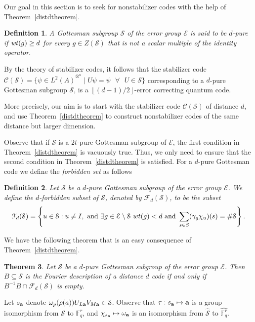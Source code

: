 \documentclass{Rinton-P9x6}
\newtheorem{theorem}{Theorem}[section]
\newtheorem{definition}[theorem]{Definition}
\newcommand{\floor}[1]{\ensuremath{\left\lfloor{#1}\right\rfloor}}
\newcommand{\GF}[2][]{{\ensuremath{\mathbb{F}_{#2}^{#1}}}}
\renewcommand{\a}{{\bf a}}
\newcommand{\om}{{\omega}}
\newcommand{\wt}{{\it wt}}
\newcommand{\C}{{\ensuremath{\mathcal{C}}}}
\renewcommand{\S}{{\ensuremath{\mathcal{S}}}}
\newcommand{\HinA}{{\ensuremath{{L^2(A)}^{\otimes^n}}}}
\newcommand{\E}{{\ensuremath{\mathcal{E}}}}
\begin{document}
Our goal in this section is to seek for nonstabilizer codes with the
help of Theorem~\ref{distdtheorem}.

\begin{definition}
  A Gottesman subgroup $\S$ of the error group $\E$ is said to be
  \emph{$d$-pure} if $\wt(g)\geq d$ for every $g \in Z(\S)$ that is
  not a scalar multiple of the identity operator.
\end{definition}

By the theory of stabilizer codes, it follows that the stabilizer code
$\C(\S)=\{\psi\in\HinA\mid U\psi=\psi\mbox{~~}\forall\mbox{~~} U\in
\S\}$ corresponding to a $d$-pure Gottesman subgroup $\S$, is a
$\floor{(d-1)/2}$-error correcting quantum code.

More precisely, our aim is to start with the stabilizer code $\C(\S)$
of distance $d$, and use Theorem~\ref{distdtheorem} to construct
nonstabilizer codes of the same distance but larger dimension.

Observe that if $\S$ is a $2t$-pure Gottesman subgroup of $\E$, the
first condition in Theorem~\ref{distdtheorem} is vacuously true. Thus,
we only need to ensure that the second condition in
Theorem~\ref{distdtheorem} is satisfied.  For a $d$-pure Gottesman
code we define the \emph{forbidden set} as follows

\begin{definition}
  Let $\S$ be a $d$-pure Gottesman subgroup of the error group $\E$.
  We define the \emph{$d$-forbidden subset} of $\S$, denoted by
  $\mathcal{F}_d(\S)$, to be the subset
  \[ 
  \mathcal{F}_d(\S) = \left\{ u \in \S : u\neq I,\hbox{ and }\exists g \in \E \setminus \S\  wt(g) < d 
  \textrm{  and }\sum_{s \in S}(\gamma_g \chi_u)(s) = \# \S \right\}.
  \]
\end{definition}

We have the following theorem that is an easy consequence of
Theorem~\ref{distdtheorem}.

\begin{theorem}\label{puredistdtheorem}
Let $\S$ be a $d$-pure Gottesman subgroup of the error group $\E$. Then 
$B \subseteq \S$ is the Fourier description of a distance $d$ code if and only if
$B^{-1}B \cap \mathcal{F}_d(\S)$ is empty.
\end{theorem}
 
Let $s_{\a}$ denote $\omega_p(\rho(a)) U_{L\a} V_{M\a}\in\S$. Observe
that $\tau: s_{\a}\mapsto \a$ is a group isomorphism from $\S$ to
$\GF[r]{q}$, and $\chi_{s_{\a}}\mapsto \om_{\a}$ is an isomorphism
from $\widehat{\S}$ to $\widehat{\GF[r]{q}}$.
    
\end{document}
